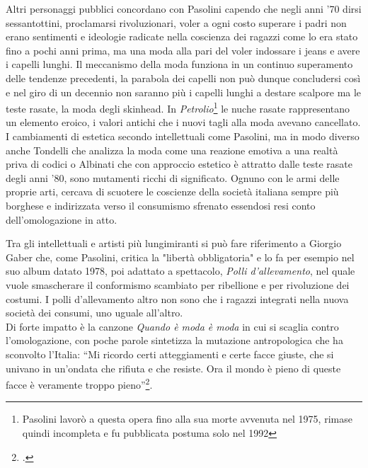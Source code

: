 Altri personaggi pubblici concordano con Pasolini capendo che negli anni '70 dirsi sessantottini, proclamarsi rivoluzionari, voler a ogni costo superare i padri non erano sentimenti e ideologie radicate nella coscienza dei ragazzi come lo era stato fino a pochi anni prima, ma una moda alla pari del voler indossare i jeans e avere i capelli lunghi.
Il meccanismo della moda funziona in un continuo superamento delle tendenze precedenti, la parabola dei capelli non può dunque concludersi così e nel giro di un decennio non saranno più i capelli lunghi a destare scalpore ma le teste rasate, la moda degli skinhead.
In \textit{Petrolio}\footnote{Pasolini lavorò a questa opera fino alla sua morte avvenuta nel 1975, rimase quindi incompleta e fu pubblicata postuma solo nel 1992} le nuche rasate rappresentano un elemento eroico, i valori antichi che i nuovi tagli alla moda avevano cancellato.
I cambiamenti di estetica secondo intellettuali come Pasolini, ma in modo diverso anche Tondelli che analizza la moda come una reazione emotiva a una realtà priva di codici o Albinati che con approccio estetico è attratto dalle teste rasate degli anni '80, sono mutamenti ricchi di significato.
Ognuno con le armi delle proprie arti, cercava di scuotere le coscienze della società italiana sempre più borghese e indirizzata verso il consumismo sfrenato essendosi resi conto dell'omologazione in atto.

Tra gli intellettuali e artisti più lungimiranti si può fare riferimento a Giorgio Gaber che, come Pasolini, critica la "libertà obbligatoria" e lo fa per esempio nel suo album datato 1978, poi adattato a spettacolo, \textit{Polli d'allevamento}, nel quale vuole smascherare il conformismo scambiato per ribellione e per rivoluzione dei costumi.
I polli d'allevamento altro non sono che i ragazzi integrati nella nuova società dei consumi, uno uguale all'altro.
\\Di forte impatto è la canzone \textit{Quando è moda è moda} in cui si scaglia contro l'omologazione, con poche parole sintetizza la mutazione antropologica che ha sconvolto l'Italia: \enquote{Mi ricordo certi atteggiamenti e certe facce giuste, che si univano in un'ondata che rifiuta e che resiste. Ora il mondo è pieno di queste facce è veramente troppo pieno}\footcite{Gaber}.












 
